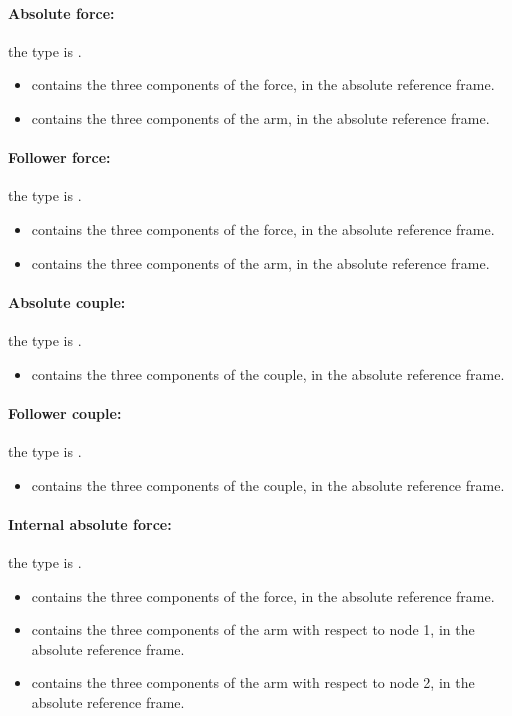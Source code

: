 \paragraph{Absolute force:}
the type is .
\begin{itemize}
\item {} contains the three components of the force, in the absolute reference frame.
\item {} contains the three components of the arm, in the absolute reference frame.
\end{itemize}

\paragraph{Follower force:}
the type is .
\begin{itemize}
\item {} contains the three components of the force, in the absolute reference frame.
\item {} contains the three components of the arm, in the absolute reference frame.
\end{itemize}

\paragraph{Absolute couple:}
the type is .
\begin{itemize}
\item {} contains the three components of the couple, in the absolute reference frame.
\end{itemize}

\paragraph{Follower couple:}
the type is .
\begin{itemize}
\item {} contains the three components of the couple, in the absolute reference frame.
\end{itemize}

\paragraph{Internal absolute force:}
the type is .
\begin{itemize}
\item {} contains the three components of the force, in the absolute reference frame.
\item {} contains the three components of the arm with respect to node 1, in the absolute reference frame.
\item {} contains the three components of the arm with respect to node 2, in the absolute reference frame.
\end{itemize}

